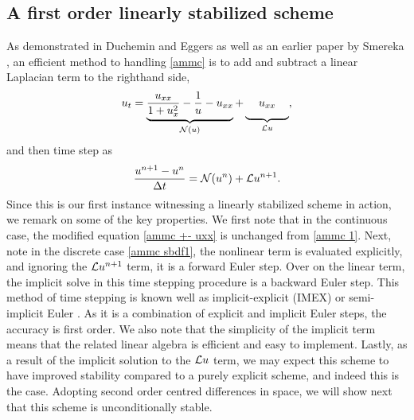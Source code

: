 \subsection{A first order linearly stabilized scheme}
As demonstrated in Duchemin and Eggers \cite{duchemin2014explicit} as well as an earlier paper by Smereka \cite{smereka2003semi}, an efficient method to handling \eqref{ammc} is to add and subtract a linear Laplacian term to the righthand side, 
\begin{align}
u_t = \underbrace{\frac{u_{xx}}{1 + u_x^2} 
- \frac{1}{u} 
- u_{xx}}_{\N(u)} 
+ \underbrace{\phantom{\frac{1_1}{1}}u_{xx}\phantom{\frac{1}{1_1}}}_{\L u}, 
\label{ammc +- uxx}
\end{align} 
and then time step as 
\begin{align}
\frac{u^{n+1} - u^n}{\Delta t} 
= \mathcal{N}(u^n) + \mathcal{L} u^{n+1}.
\label{ammc sbdf1}
\end{align}
Since this is our first instance witnessing a linearly stabilized scheme in action, we remark on some of the key properties. We first note that in the continuous case, the modified equation \eqref{ammc +- uxx} is unchanged from \eqref{ammc 1}. Next, note in the discrete case \eqref{ammc sbdf1}, the nonlinear term is evaluated explicitly, and ignoring the $\mathcal{L} u^{n+1}$ term, it is a forward Euler step. Over on the linear term, the implicit solve in this time stepping procedure is a backward Euler step. This method of time stepping is known well as implicit-explicit (IMEX) or semi-implicit Euler \cite{ascher1995implicit,smereka2003semi}. As it is a combination of explicit and implicit Euler steps, the accuracy is first order. We also note that the simplicity of the implicit term means that the related linear algebra is efficient and easy to implement. Lastly, as a result of the implicit solution to the $\mathcal{L} u$ term, we may expect this scheme to have improved stability compared to a purely explicit scheme, and indeed this is the case. Adopting second order centred differences in space, we will show next that this scheme is unconditionally stable.

